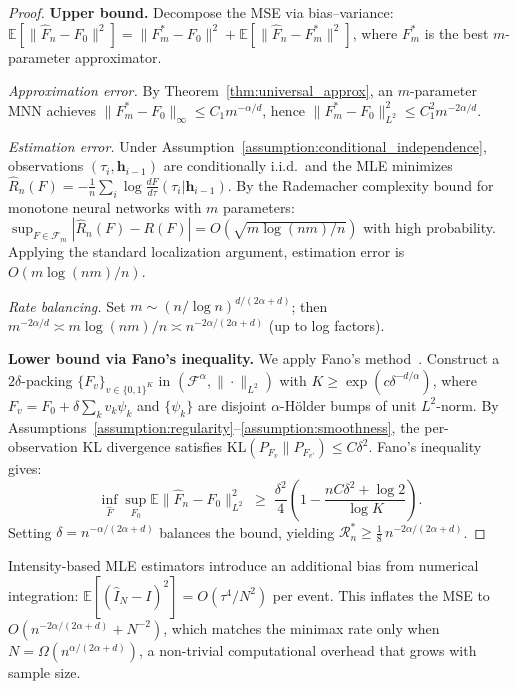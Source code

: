 \begin{proof}
\textbf{Upper bound.}
Decompose the MSE via bias--variance:
$\mathbb{E}[\|\hat{F}_n - F_0\|^2]
= \|F_m^* - F_0\|^2
+ \mathbb{E}[\|\hat{F}_n - F_m^*\|^2]$,
where $F_m^*$ is the best $m$-parameter approximator.

\emph{Approximation error.}
By Theorem~\ref{thm:universal_approx}, an $m$-parameter MNN achieves
$\|F_m^* - F_0\|_\infty \leq C_1 m^{-\alpha/d}$,
hence $\|F_m^* - F_0\|_{L^2}^2 \leq C_1^2 m^{-2\alpha/d}$.

\emph{Estimation error.}
Under Assumption~\ref{assumption:conditional_independence}, observations
$(\tau_i, \boldsymbol{h}_{i-1})$ are conditionally i.i.d.\ and the MLE minimizes
$\hat{R}_n(F) = -\frac{1}{n}\sum_i \log\frac{dF}{d\tau}(\tau_i|\boldsymbol{h}_{i-1})$.
By the Rademacher complexity bound for monotone neural networks
with $m$ parameters:
$\sup_{F \in \mathcal{F}_m} |\hat{R}_n(F) - R(F)| = O(\sqrt{m\log(nm)/n})$
with high probability.
Applying the standard localization argument, estimation error is $O(m\log(nm)/n)$.

\emph{Rate balancing.}
Set $m \sim (n/\log n)^{d/(2\alpha+d)}$; then
$m^{-2\alpha/d} \asymp m\log(nm)/n \asymp n^{-2\alpha/(2\alpha+d)}$
(up to log factors).

\textbf{Lower bound via Fano's inequality.}
We apply Fano's method~\cite{tsybakov2009introduction}.
Construct a $2\delta$-packing $\{F_v\}_{v \in \{0,1\}^K}$ in
$(\mathcal{F}^\alpha, \|\cdot\|_{L^2})$ with $K \geq \exp(c\delta^{-d/\alpha})$,
where $F_v = F_0 + \delta\sum_k v_k\psi_k$ and $\{\psi_k\}$ are disjoint
$\alpha$-H\"{o}lder bumps of unit $L^2$-norm.
By Assumptions~\ref{assumption:regularity}--\ref{assumption:smoothness}, the per-observation
KL divergence satisfies $\mathrm{KL}(P_{F_v}\|P_{F_{v'}}) \leq C\delta^2$.
Fano's inequality gives:
\[
\inf_{\hat{F}}\sup_{F_0}\mathbb{E}\|\hat{F}_n - F_0\|_{L^2}^2
\;\geq\; \frac{\delta^2}{4}\!\left(1 - \frac{nC\delta^2 + \log 2}{\log K}\right).
\]
Setting $\delta = n^{-\alpha/(2\alpha+d)}$ balances the bound, yielding
$\mathcal{R}_n^* \geq \frac{1}{8}\,n^{-2\alpha/(2\alpha+d)}$.
\end{proof}

\begin{remark}
Intensity-based MLE estimators introduce an additional bias from numerical
integration: $\mathbb{E}[(\hat{I}_N - I)^2] = O(\tau^4/N^2)$ per event.
This inflates the MSE to $O(n^{-2\alpha/(2\alpha+d)} + N^{-2})$, which matches
the minimax rate only when $N = \Omega(n^{\alpha/(2\alpha+d)})$, a non-trivial
computational overhead that grows with sample size.
\end{remark}
